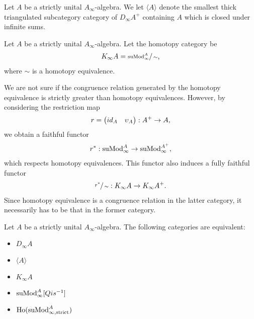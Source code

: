 \documentclass[../thesis.tex]{subfiles}
\begin{document}
            \begin{definition}
                Let $A$ be a strictly unital $A_\infty$-algebra. We let $\langle A \rangle$ denote the smallest thick triangulated subcategory category of $D_\infty A^+$ containing $A$ which is closed under infinite sums. 
            \end{definition}

            \begin{definition}
                Let $A$ be a strictly unital $A_\infty$-algebra. Let the homotopy category be
                \begin{align*}
                    K_\infty A = \sfrac{\tt{suMod}_\infty^A}{\sim}\tt{,}
                \end{align*}
                where $\sim$ is a homotopy equivalence.
            \end{definition}

            We are not sure if the congruence relation generated by the homotopy equivalence is strictly greater than homotopy equivalences. However, by considering the restriction map
            \begin{align*}
                r = \begin{pmatrix}
                    id_A & \upsilon_A
                \end{pmatrix} : A^+ \rightarrow A\tt{,} 
            \end{align*}
            we obtain a faithful functor
            \begin{align*}
                r^* : \tt{suMod}_\infty^A \rightarrow \tt{suMod}_\infty^{A^+}\tt{,}
            \end{align*}
            which respects homotopy equivalences. This functor also induces a fully faithful functor
            \begin{align*}
                \sfrac{r^*}{\sim} : K_\infty A \rightarrow K_\infty A^+\tt{.}
            \end{align*}
            Since homotopy equivalence is a congruence relation in the latter category, it necessarily has to be that in the former category.

            \begin{thm}
                Let $A$ be a strictly unital $A_\infty$-algebra. The following categories are equivalent:
                \begin{itemize}
                    \item $D_\infty A$
                    \item $\langle A \rangle$
                    \item $K_\infty A$
                    \item $\tt{suMod}_\infty^A[Qis^{-1}]$
                    \item $\tt{Ho}(\tt{suMod}_{\infty,\tt{strict}}^A)$
                \end{itemize}
            \end{thm}
\end{document}
